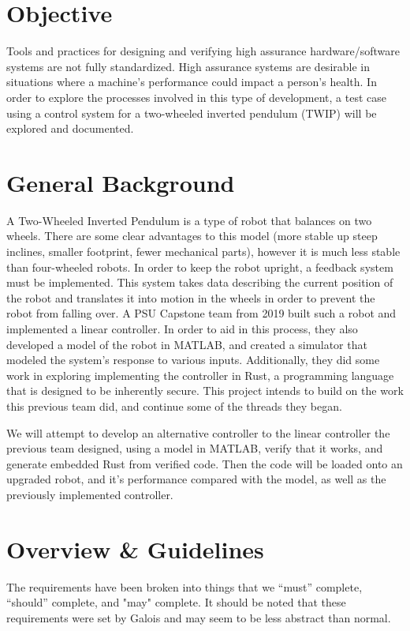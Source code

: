 \documentclass[a4paper,12pt]{article}
\begin{document}
\section{Objective}
	Tools and practices for designing and verifying high assurance hardware/software systems are not fully standardized. High assurance systems are desirable in situations where a machine's performance could impact a person's health. In order to explore the processes involved in this type of development, a test case using a control system for a two-wheeled inverted pendulum (TWIP) will be explored and documented.
	
\section{General Background}
	A Two-Wheeled Inverted Pendulum is a type of robot that balances on two wheels. There are some clear advantages to this model (more stable up steep inclines, smaller footprint, fewer mechanical parts), however it is much less stable than four-wheeled robots. In order to keep the robot upright, a feedback system must be implemented. This system takes data describing the current position of the robot and translates it into motion in the wheels in order to prevent the robot from falling over. A PSU Capstone team from 2019 built such a robot and implemented a linear controller. In order to aid in this process, they also developed a model of the robot in MATLAB, and created a simulator that modeled the system's response to various inputs. Additionally, they did some work in exploring implementing the controller in Rust, a programming language that is designed to be inherently secure. This project intends to build on the work this previous team did, and continue some of the threads they began. 
	
	We will attempt to develop an alternative controller to the linear controller the previous team designed, using a model in MATLAB, verify that it works, and generate embedded Rust from verified code. Then the code will be loaded onto an upgraded robot, and it's performance compared with the model, as well as the previously implemented controller.
	
\section{Overview \& Guidelines}
The requirements have been broken into things that we “must” complete, “should” complete, and "may" complete. It should be noted that these requirements were set by Galois and may seem to be less abstract than normal.\\
\end{document}
